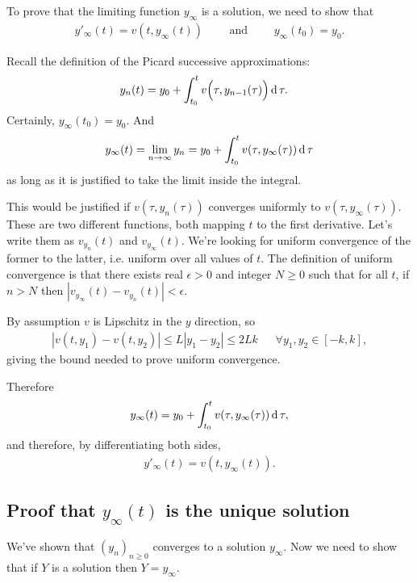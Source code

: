 To prove that the limiting function $y_\infty$ is a solution, we need to show
that
\begin{align*}
  y'_\infty(t) = v(t, y_\infty(t)) \text{~~~~~~~and~~~~~~~} y_\infty(t_0) = y_0.
\end{align*}

Recall the definition of the Picard successive approximations:
\begin{align*}
    y_n(t) &= y_0 + \int_{t_0}^t v\Big(\tau, y_{n-1}(\tau)\Big) \operatorname{\text{d}}\tau.
\end{align*}
Certainly, $y_\infty(t_0) = y_0$. And
\begin{align*}
  y_\infty(t) = \lim_{n\to \infty} y_n = y_0 + \int_{t_0}^t v(\tau, y_\infty(\tau)) \operatorname{\text{d}}\tau
\end{align*}
as long as it is justified to take the limit inside the integral.

This would be justified if $v(\tau, y_n(\tau))$ converges uniformly to
$v(\tau, y_\infty(\tau))$. These are two different functions, both mapping $t$
to the first derivative. Let's write them as $v_{y_n}(t)$ and
$v_{y_\infty}(t)$. We're looking for uniform convergence of the former to the
latter, i.e. uniform over all values of $t$. The definition of uniform
convergence is that there exists real $\epsilon > 0$ and integer $N \geq 0$
such that for all $t$, if $n > N$ then
$|v_{y_\infty}(t) - v_{y_n}(t)| < \epsilon$.

By assumption $v$ is Lipschitz in the $y$ direction, so
\begin{align*}
  |v(t, y_1) - v(t, y_2)| \leq L|y_1 - y_2| \leq 2Lk ~~~~~~~\forall y_1, y_2 \in [-k, k],
\end{align*}
giving the bound needed to prove uniform convergence.

Therefore
\begin{align*}
  y_\infty(t) = y_0 + \int_{t_0}^t v(\tau, y_\infty(\tau)) \operatorname{\text{d}}\tau,
\end{align*}
and therefore, by differentiating both sides,
\begin{align*}
  y'_\infty(t) = v(t, y_\infty(t)).
\end{align*}

\subsection{Proof that $y_\infty(t)$ is the unique solution}

We've shown that $(y_n)_{n\geq 0}$ converges to a solution $y_\infty$. Now we
need to show that if $Y$ is a solution then $Y = y_\infty$.


